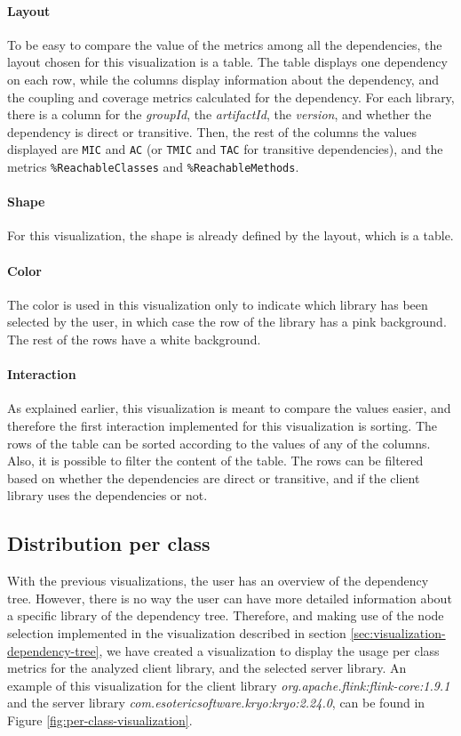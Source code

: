 \paragraph{Layout}
To be easy to compare the value of the metrics among all the dependencies, the layout chosen for this visualization is a table. The table displays one dependency on each row, while the columns display information about the dependency, and the coupling and coverage metrics calculated for the dependency. For each library, there is a column for the \textit{groupId}, the \textit{artifactId}, the \textit{version}, and whether the dependency is direct or transitive. Then, the rest of the columns the values displayed are \texttt{MIC} and \texttt{AC} (or \texttt{TMIC} and \texttt{TAC} for transitive dependencies), and the metrics \texttt{\%ReachableClasses} and \texttt{\%ReachableMethods}.

\paragraph{Shape}
For this visualization, the shape is already defined by the layout, which is a table.

\paragraph{Color}
The color is used in this visualization only to indicate which library has been selected by the user, in which case the row of the library has a pink background. The rest of the rows have a white background.

\paragraph{Interaction}
As explained earlier, this visualization is meant to compare the values easier, and therefore the first interaction implemented for this visualization is sorting. The rows of the table can be sorted according to the values of any of the columns. Also, it is possible to filter the content of the table. The rows can be filtered based on whether the dependencies are direct or transitive, and if the client library uses the dependencies or not.

\subsection{Distribution per class}
With the previous visualizations, the user has an overview of the dependency tree. However, there is no way the user can have more detailed information about a specific library of the dependency tree. Therefore, and making use of the node selection implemented in the visualization described in section \ref{sec:visualization-dependency-tree}, we have created a visualization to display the usage per class metrics for the analyzed client library, and the selected server library. An example of this visualization for the client library \textit{org.apache.flink:flink-core:1.9.1} and the server library \textit{com.esotericsoftware.kryo:kryo:2.24.0}, can be found in Figure \ref{fig:per-class-visualization}.

